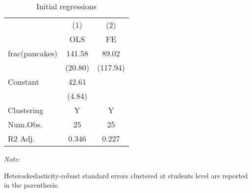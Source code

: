 \begin{table}

\caption{Initial regressions}
\centering
\begin{threeparttable}
\begin{tabular}[t]{lcc}
\midrule\midrule
\multicolumn{1}{c}{ } & \multicolumn{1}{c}{(1)} & \multicolumn{1}{c}{(2)} \\
\cmidrule(l{3pt}r{3pt}){2-2} \cmidrule(l{3pt}r{3pt}){3-3}
  & OLS & FE\\
\midrule
frac(pancakes) & \num{141.58} & \num{89.02}\\
 & (\num{20.80}) & (\num{117.94})\\
Constant & \num{42.61} & \\
 & (\num{4.84}) & \\
\midrule
Clustering & Y & Y\\
Num.Obs. & \num{25} & \num{25}\\
R2 Adj. & \num{0.346} & \num{0.227}\\
\midrule\midrule
\end{tabular}
\begin{tablenotes}
\item \textit{Note: } 
\item Heteroskedasticity-robust standard errors clustered at students level are reported in the parenthesis.
\end{tablenotes}
\end{threeparttable}
\end{table}
